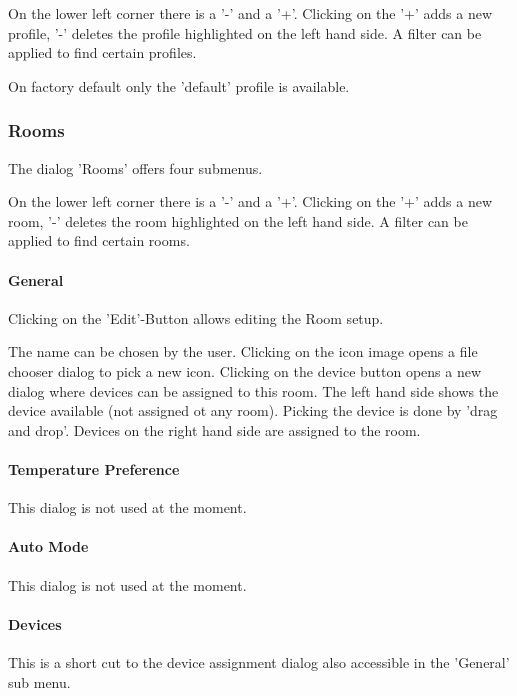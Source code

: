 On the lower left corner there is a '-' and a '+'. Clicking on the '+' adds a new
profile, '-' deletes the profile highlighted on the left hand side. A filter can 
be applied to find certain profiles.

On factory default only the 'default' profile is available.

\subsubsection{Rooms}

The dialog 'Rooms' offers four submenus.

On the lower left corner there is a '-' and a '+'. Clicking on the '+' adds a new
room, '-' deletes the room highlighted on the left hand side. A filter can 
be applied to find certain rooms.

\paragraph{General}

Clicking on the 'Edit'-Button allows editing the Room setup.

The name can be chosen by the user. Clicking on the icon image opens a file chooser 
dialog to pick a new icon. Clicking on the device button opens a new dialog where 
devices can be assigned to this room. The left hand side shows the device available (not 
assigned ot any room). Picking the device is done by 'drag and drop'.
Devices on the right hand side are assigned to the room.

\paragraph{Temperature Preference}

This dialog is not used at the moment.

\paragraph{Auto Mode}

This dialog is not used at the moment.

\paragraph{Devices}

This is a short cut to the device assignment dialog also accessible in the 'General'
sub menu.

